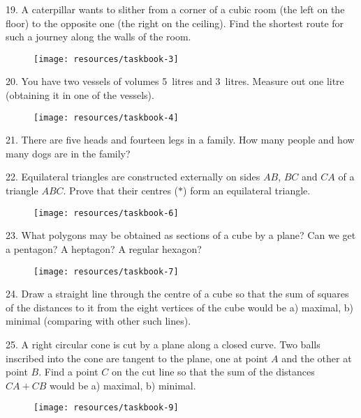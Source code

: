 \begin{problem}{19.}
A caterpillar wants to slither from a corner of a cubic room (the left on the floor) to the opposite one
(the right on the ceiling).
Find the shortest route for such a journey along the walls of the room.
\begin{figure}
	\texttt{[image: resources/taskbook-3]}
\end{figure}
\end{problem}

\begin{problem}{20.}
You have two vessels of volumes 5~litres and 3~litres. Measure out one litre (obtaining it in one of the vessels).
\begin{figure}
	\texttt{[image: resources/taskbook-4]}
\end{figure}
\end{problem}

\begin{problem}{21.}
There are five heads and fourteen legs in a family. How many people and how many dogs are in the family?
\end{problem}

\begin{problem}{22.}
Equilateral triangles are constructed externally on sides $AB$, $BC$ and $CA$ of a triangle $ABC$.
Prove that their centres ($*$) form an equilateral triangle.
\begin{figure}
	\texttt{[image: resources/taskbook-6]}
\end{figure}
\end{problem}

\begin{problem}{23.}
What polygons may be obtained as sections of a cube by a plane? Can we get a pentagon? A heptagon?
A regular hexagon?
\begin{figure}
	\texttt{[image: resources/taskbook-7]}
\end{figure}
\end{problem}

\begin{problem}{24.}
Draw a straight line through the centre of a cube so that the sum of squares of the distances to it
from the eight vertices of the cube would be
a) maximal,
b) minimal (comparing with other such lines).
\end{problem}

\begin{problem}{25.}
A right circular cone is cut by a plane along a closed curve. Two balls inscribed into the cone
are tangent to the plane, one at point $A$ and the other at point $B$. Find a point $C$ on the cut line so
that the sum of the distances $CA + CB$ would be a) maximal, b) minimal.
\begin{figure}
	\texttt{[image: resources/taskbook-9]}
\end{figure}
\end{problem}

